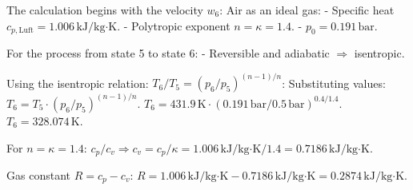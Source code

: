 The calculation begins with the velocity \( w_6 \):  
Air as an ideal gas:  
- Specific heat \( c_{p,\text{Luft}} = 1.006 \, \text{kJ/kg·K} \).  
- Polytropic exponent \( n = \kappa = 1.4 \).  
- \( p_0 = 0.191 \, \text{bar} \).  

For the process from state 5 to state 6:  
- Reversible and adiabatic \( \Rightarrow \) isentropic.  

Using the isentropic relation:  
\( T_6 / T_5 = (p_6 / p_5)^{(n-1)/n} \):  
Substituting values:  
\( T_6 = T_5 \cdot (p_6 / p_5)^{(n-1)/n} \).  
\( T_6 = 431.9 \, \text{K} \cdot (0.191 \, \text{bar} / 0.5 \, \text{bar})^{0.4/1.4} \).  
\( T_6 = 328.074 \, \text{K} \).  

For \( n = \kappa = 1.4 \):  
\( c_p / c_v \Rightarrow c_v = c_p / \kappa = 1.006 \, \text{kJ/kg·K} / 1.4 = 0.7186 \, \text{kJ/kg·K} \).  

Gas constant \( R = c_p - c_v \):  
\( R = 1.006 \, \text{kJ/kg·K} - 0.7186 \, \text{kJ/kg·K} = 0.2874 \, \text{kJ/kg·K} \).